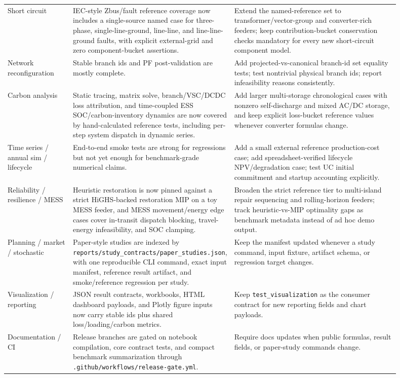\begin{longtable}{@{}L{0.17\linewidth}L{0.28\linewidth}L{0.45\linewidth}@{}}
Short circuit & IEC-style Zbus/fault reference coverage now includes a single-source named case for three-phase, single-line-ground, line-line, and line-line-ground faults, with explicit external-grid and zero component-bucket assertions. & Extend the named-reference set to transformer/vector-group and converter-rich feeders; keep contribution-bucket conservation checks mandatory for every new short-circuit component model. \\
Network reconfiguration & Stable branch ids and PF post-validation are mostly complete. & Add projected-vs-canonical branch-id set equality tests; test nontrivial physical branch ids; report infeasibility reasons consistently. \\
Carbon analysis & Static tracing, matrix solve, branch/VSC/DCDC loss attribution, and time-coupled ESS SOC/carbon-inventory dynamics are now covered by hand-calculated reference tests, including per-step system dispatch in dynamic series. & Add larger multi-storage chronological cases with nonzero self-discharge and mixed AC/DC storage, and keep explicit loss-bucket reference values whenever converter formulas change. \\
Time series / annual sim / lifecycle & End-to-end smoke tests are strong for regressions but not yet enough for benchmark-grade numerical claims. & Add a small external reference production-cost case; add spreadsheet-verified lifecycle NPV/degradation case; test UC initial commitment and startup accounting explicitly. \\
Reliability / resilience / MESS & Heuristic restoration is now pinned against a strict HiGHS-backed restoration MIP on a toy MESS feeder, and MESS movement/energy edge cases cover in-transit dispatch blocking, travel-energy infeasibility, and SOC clamping. & Broaden the strict reference tier to multi-island repair sequencing and rolling-horizon feeders; track heuristic-vs-MIP optimality gaps as benchmark metadata instead of ad hoc demo output. \\
Planning / market / stochastic & Paper-style studies are indexed by \texttt{reports/study\_contracts/paper\_studies.json}, with one reproducible CLI command, exact input manifest, reference result artifact, and smoke/reference regression per study. & Keep the manifest updated whenever a study command, input fixture, artifact schema, or regression target changes. \\
Visualization / reporting & JSON result contracts, workbooks, HTML dashboard payloads, and Plotly figure inputs now carry stable ids plus shared loss/loading/carbon metrics. & Keep \texttt{test\_visualization} as the consumer contract for new reporting fields and chart payloads. \\
Documentation / CI & Release branches are gated on notebook compilation, core contract tests, and compact benchmark summarization through \texttt{.github/workflows/release-gate.yml}. & Require docs updates when public formulas, result fields, or paper-study commands change. \\
\bottomrule
\end{longtable}

